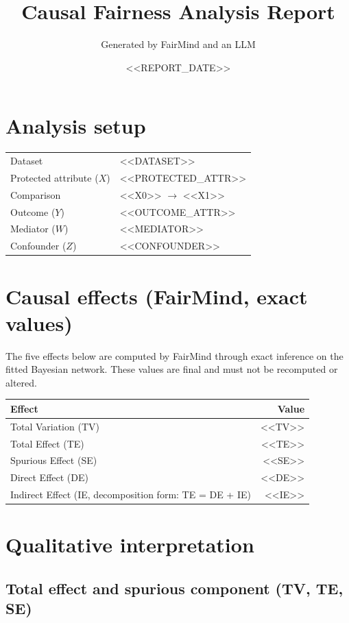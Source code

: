 \documentclass[11pt]{article}
\title{Causal Fairness Analysis Report}
\author{Generated by FairMind and an LLM}
\date{<<REPORT_DATE>>}
\begin{document}
\maketitle

\section{Analysis setup}

\begin{tabular}{ll}
\toprule
Dataset & <<DATASET>> \\
Protected attribute ($X$) & <<PROTECTED_ATTR>> \\
Comparison & <<X0>> $\to$ <<X1>> \\
Outcome ($Y$) & <<OUTCOME_ATTR>> \\
Mediator ($W$) & <<MEDIATOR>> \\
Confounder ($Z$) & <<CONFOUNDER>> \\
\bottomrule
\end{tabular}

\section{Causal effects (FairMind, exact values)}

The five effects below are computed by FairMind through exact inference on the
fitted Bayesian network. These values are final and must not be recomputed or
altered.

\begin{tabular}{lr}
\toprule
Effect & Value \\
\midrule
Total Variation (TV) & <<TV>> \\
Total Effect (TE) & <<TE>> \\
Spurious Effect (SE) & <<SE>> \\
Direct Effect (DE) & <<DE>> \\
Indirect Effect (IE, decomposition form: TE = DE + IE) & <<IE>> \\
\bottomrule
\end{tabular}

\section{Qualitative interpretation}

\subsection{Total effect and spurious component (TV, TE, SE)}
\end{document}
